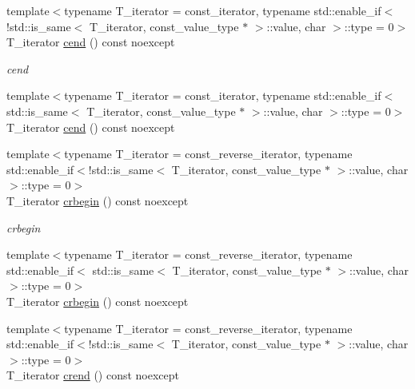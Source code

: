 \begin{DoxyCompactItemize}
\item 
{\footnotesize template$<$typename T\+\_\+iterator  = const\+\_\+iterator, typename std\+::enable\+\_\+if$<$!std\+::is\+\_\+same$<$ T\+\_\+iterator, const\+\_\+value\+\_\+type $\ast$ $>$\+::value, char $>$\+::type  = 0$>$ }\\T\+\_\+iterator \hyperlink{classIceBRG_1_1labeled__array__col__reference_a16d0319816f57cba47d083247e161b5a}{cend} () const  noexcept
\begin{DoxyCompactList}\small\item\em cend \end{DoxyCompactList}\item 
{\footnotesize template$<$typename T\+\_\+iterator  = const\+\_\+iterator, typename std\+::enable\+\_\+if$<$ std\+::is\+\_\+same$<$ T\+\_\+iterator, const\+\_\+value\+\_\+type $\ast$ $>$\+::value, char $>$\+::type  = 0$>$ }\\T\+\_\+iterator \hyperlink{classIceBRG_1_1labeled__array__col__reference_a16d0319816f57cba47d083247e161b5a}{cend} () const  noexcept
\item 
{\footnotesize template$<$typename T\+\_\+iterator  = const\+\_\+reverse\+\_\+iterator, typename std\+::enable\+\_\+if$<$!std\+::is\+\_\+same$<$ T\+\_\+iterator, const\+\_\+value\+\_\+type $\ast$ $>$\+::value, char $>$\+::type  = 0$>$ }\\T\+\_\+iterator \hyperlink{classIceBRG_1_1labeled__array__col__reference_aa4c4d4e0fa027184b7df5c86c0886ae5}{crbegin} () const  noexcept
\begin{DoxyCompactList}\small\item\em crbegin \end{DoxyCompactList}\item 
{\footnotesize template$<$typename T\+\_\+iterator  = const\+\_\+reverse\+\_\+iterator, typename std\+::enable\+\_\+if$<$ std\+::is\+\_\+same$<$ T\+\_\+iterator, const\+\_\+value\+\_\+type $\ast$ $>$\+::value, char $>$\+::type  = 0$>$ }\\T\+\_\+iterator \hyperlink{classIceBRG_1_1labeled__array__col__reference_aa4c4d4e0fa027184b7df5c86c0886ae5}{crbegin} () const  noexcept
\item 
{\footnotesize template$<$typename T\+\_\+iterator  = const\+\_\+reverse\+\_\+iterator, typename std\+::enable\+\_\+if$<$!std\+::is\+\_\+same$<$ T\+\_\+iterator, const\+\_\+value\+\_\+type $\ast$ $>$\+::value, char $>$\+::type  = 0$>$ }\\T\+\_\+iterator \hyperlink{classIceBRG_1_1labeled__array__col__reference_a0f27d46dfc2dabc41437b83967b70087}{crend} () const  noexcept

\end{DoxyCompactItemize}
